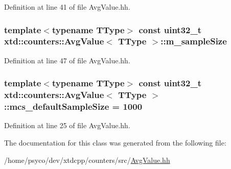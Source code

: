 Definition at line 41 of file Avg\+Value.\+hh.

\subsubsection[{\texorpdfstring{m\+\_\+sample\+Size}{m_sampleSize}}]{\setlength{\rightskip}{0pt plus 5cm}template$<$typename T\+Type$>$ const uint32\+\_\+t {\bf xtd\+::counters\+::\+Avg\+Value}$<$ T\+Type $>$\+::m\+\_\+sample\+Size\hspace{0.3cm}{\ttfamily [protected]}}\hypertarget{classxtd_1_1counters_1_1AvgValue_a85edafd4829b5aa5be6562cadd8e4764}{}\label{classxtd_1_1counters_1_1AvgValue_a85edafd4829b5aa5be6562cadd8e4764}


Definition at line 47 of file Avg\+Value.\+hh.

\subsubsection[{\texorpdfstring{mcs\+\_\+default\+Sample\+Size}{mcs_defaultSampleSize}}]{\setlength{\rightskip}{0pt plus 5cm}template$<$typename T\+Type$>$ const uint32\+\_\+t {\bf xtd\+::counters\+::\+Avg\+Value}$<$ T\+Type $>$\+::mcs\+\_\+default\+Sample\+Size = 1000\hspace{0.3cm}{\ttfamily [static]}}\hypertarget{classxtd_1_1counters_1_1AvgValue_aa65f0400547f2cb940ec9b79cbc3a662}{}\label{classxtd_1_1counters_1_1AvgValue_aa65f0400547f2cb940ec9b79cbc3a662}


Definition at line 25 of file Avg\+Value.\+hh.



The documentation for this class was generated from the following file\+:\begin{DoxyCompactItemize}
\item 
/home/psyco/dev/xtdcpp/counters/src/\hyperlink{AvgValue_8hh}{Avg\+Value.\+hh}\end{DoxyCompactItemize}
